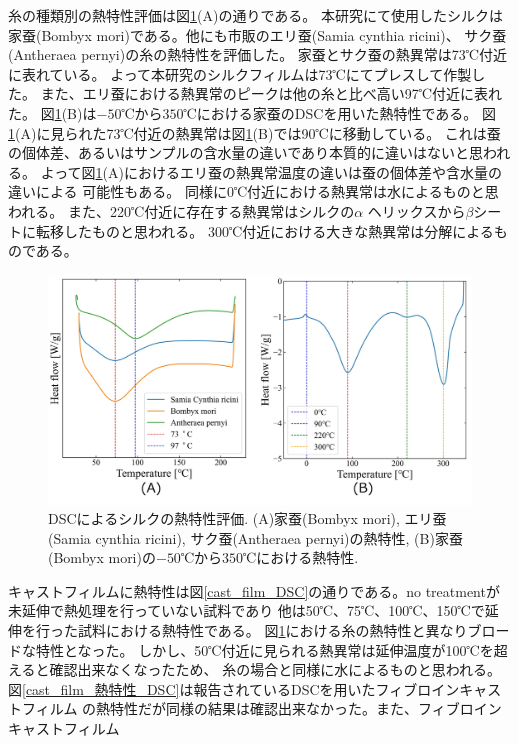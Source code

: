 \documentclass[dvipdfmx,12pt,a4paper]{jreport}
\begin{document}
		糸の種類別の熱特性評価は図\ref{DSC熱特性評価}(A)の通りである。
		本研究にて使用したシルクは家蚕(Bombyx mori)である。他にも市販のエリ蚕(Samia cynthia ricini)、
		サク蚕(Antheraea pernyi)の糸の熱特性を評価した。
		家蚕とサク蚕の熱異常は73℃付近に表れている。
		よって本研究のシルクフィルムは73℃にてプレスして作製した。
		また、エリ蚕における熱異常のピークは他の糸と比べ高い97℃付近に表れた。
		図\ref{DSC熱特性評価}(B)は$-50$℃から$350$℃における家蚕のDSCを用いた熱特性である。
		図\ref{DSC熱特性評価}(A)に見られた73℃付近の熱異常は図\ref{DSC熱特性評価}(B)では90℃に移動している。
		これは蚕の個体差、あるいはサンプルの含水量の違いであり本質的に違いはないと思われる。
		よって図\ref{DSC熱特性評価}(A)におけるエリ蚕の熱異常温度の違いは蚕の個体差や含水量の違いによる
		可能性もある。
		同様に0℃付近における熱異常は水によるものと思われる。
		また、220℃付近に存在する熱異常はシルクの$\alpha$ ヘリックスから$\beta$シートに転移したものと思われる。
		300℃付近における大きな熱異常は分解によるものである。
		\begin{figure}[H]
			\centering
			\includegraphics[scale=0.75]{DSC_silk_0112_2.jpg}
			\caption{DSCによるシルクの熱特性評価. (A)家蚕(Bombyx mori), エリ蚕(Samia cynthia ricini), 
			サク蚕(Antheraea pernyi)の熱特性, (B)家蚕(Bombyx mori)の$-50$℃から$350$℃における熱特性.}
			\label{DSC熱特性評価}
		\end{figure}
		\newpage
		キャストフィルムに熱特性は図\ref{cast_film_DSC}の通りである。no treatmentが未延伸で熱処理を行っていない試料であり
		他は50℃、75℃、100℃、150℃で延伸を行った試料における熱特性である。
		図\ref{DSC熱特性評価}における糸の熱特性と異なりブロードな特性となった。
		しかし、50℃付近に見られる熱異常は延伸温度が100℃を超えると確認出来なくなったため、
		糸の場合と同様に水によるものと思われる。
		図\ref{cast_film_熱特性_DSC}は報告されているDSCを用いたフィブロインキャストフィルム
		の熱特性だが同様の結果は確認出来なかった。また、フィブロインキャストフィルム
\end{document}
